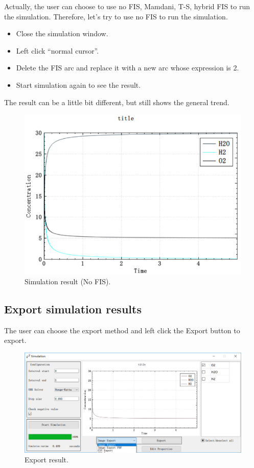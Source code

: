 \documentclass[journal,a4paper,onecolumn]{article}
\begin{document}
Actually, the user can choose to use no FIS, Mamdani, T-S, hybrid FIS to run the simulation. Therefore, let's try to use no FIS to run the simulation. 

\begin{itemize}
	\item Close the simulation window.
	\item Left click ``normal cursor''.
	\item Delete the FIS arc and replace it with a new arc whose expression is 2.
	\item Start simulation again to see the result.
\end{itemize}

The result can be a little bit different, but still shows the general trend.

\begin{figure}[!hbt]
	\begin{center}
		\includegraphics[width=\columnwidth]{fig15}
		\caption{Simulation result (No FIS).}
		\label{fig:Simulation result (No FIS)}
	\end{center}
\end{figure}

\subsection{Export simulation results}
The user can choose the export method and left click the Export button to export.
\begin{figure}[!hbt]
	\begin{center}
		\includegraphics[width=\columnwidth]{fig19}
		\caption{Export result.}
		\label{fig:Export result}
	\end{center}
\end{figure}
\end{document}
